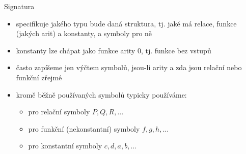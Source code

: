 \documentclass{beamer}
\begin{document}
\begin{frame}{Signatura}

    \begin{itemize}
        \item specifikuje jakého \alert{typu} bude daná struktura, tj. jaké  má relace, funkce (jakých arit) a konstanty, a symboly pro ně 
        \item \alert{konstanty} lze chápat jako funkce arity 0, tj. funkce bez vstupů
    \end{itemize}


    \bigskip

    \begin{itemize}
        \item často zapíšeme jen výčtem symbolů, jsou-li arity a zda jsou relační nebo funkční zřejmé
        \item kromě běžně používaných symbolů typicky používáme:
        \begin{itemize}
            \item pro relační symboly $P,Q,R,\dots$
            \item pro funkční (nekonstantní) symboly $f,g,h,\dots$
            \item pro konstantní symboly $c,d,a,b,\dots$
        \end{itemize}
    \end{itemize}
    

\end{frame}
\end{document}
